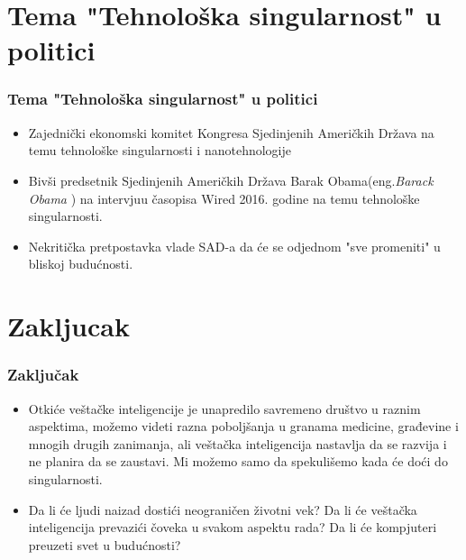 \documentclass{beamer}
\begin{document}
\section{Tema "Tehnološka singularnost" u politici}

\begin{frame}[fragile]\frametitle{Tema "Tehnološka singularnost" u politici}
	\begin{itemize}	
		\item Zajednički ekonomski komitet Kongresa Sjedinjenih Američkih Država na temu tehnološke singularnosti  i nanotehnologije
		\item Bivši predsetnik Sjedinjenih Američkih Država Barak Obama(eng.\textit{Barack Obama} ) na intervjuu časopisa Wired 2016. godine na temu tehnološke singularnosti.
		\item Nekritička pretpostavka vlade SAD-a da će se odjednom "sve promeniti" u bliskoj budućnosti.
	\end{itemize}
\end{frame}

\section{Zakljucak}

\begin{frame}[fragile]\frametitle{Zaključak}
\begin{itemize}	
 \item Otkiće veštačke inteligencije je unapredilo savremeno društvo  u raznim aspektima, možemo videti razna poboljšanja u granama medicine, građevine i mnogih drugih zanimanja, ali veštačka inteligencija nastavlja da se razvija i ne planira da se zaustavi. Mi možemo samo da spekulišemo kada će doći do singularnosti.
\item Da li će ljudi naizad dostići neograničen životni vek? Da li će veštačka inteligencija prevazići čoveka u svakom aspektu rada? Da li će kompjuteri preuzeti svet u budućnosti?

\end{itemize}
\end{frame}
\end{document}
